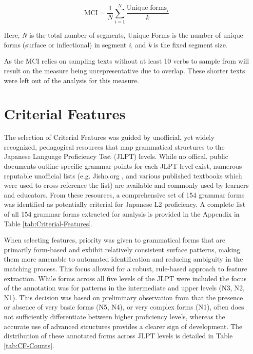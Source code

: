 \begin{equation}
    \text{MCI} = \frac{1}{N}\sum_{i=1}^{N} \frac{\text{Unique forms}_i}{k}
\end{equation}

Here, \textit{N} is the total number of segments, Unique Forms is the number of unique forms (surface or
inflectional) in segment \textit{i}, and \textit{k} is the fixed segment size.

As the MCI relies on sampling texts without at least 10 verbs to sample from will result on the measure being
unrepresentative due to overlap. These shorter texts were left out of the analysis for this measure.
\section{Criterial Features}
The selection of Criterial Features was guided by unofficial, yet widely recognized, pedagogical resources that map
grammatical structures to the Japanese Language Proficiency Test (JLPT) levels. While no offical, public documents
outline specific grammar points for each JLPT level exist, numerous reputable unofficial lists (e.g. Jisho.org \citep{jisho.org}, and
various published textbooks which were used to cross-reference the list) are available and
commonly used by learners and educators. From these resources, a comprehensive set of 154 grammar forms was
identified as potentially criterial for Japanese L2 proficiency. A complete list of all 154 grammar forms extracted
for analysis is provided in the Appendix in Table \ref{tab:Criterial-Features}.

When selecting features, priority was given to grammatical forms that are primarily form-based and exhibit
relatively consistent surface patterns, making them more amenable to automated identification and reducing
ambiguity in the matching process. This focus allowed for a robust, rule-based approach to feature extraction. While
forms across all five levels of the JLPT were included the focus of the annotation was for patterns in the
intermediate and upper levels (N3, N2, N1). This decision was based on preliminary observation from \citet{akef2025}
that the presence or absence of very basic forms (N5, N4), or very complex forms (N1), often does not sufficiently
differentiate between higher
proficiency levels, whereas the accurate use of advanced structures provides a clearer sign of development. The
distribution of these annotated forms across JLPT levels is detailed in Table
\ref{tab:CF-Counts}.

